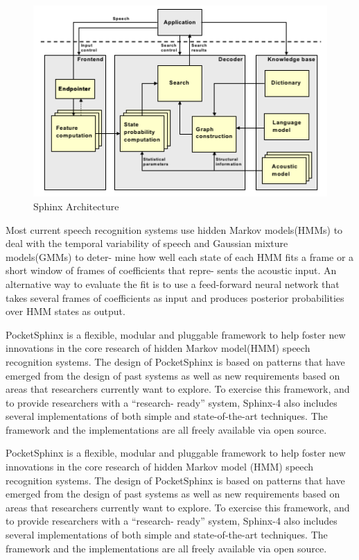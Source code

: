 \documentclass[12pt,a4paper,oldfontcommands]{memoir}
\begin{document}
\begin{figure}[h]
    \centering
    \includegraphics[scale=1.0]{sphinx4_architecture}
    \caption{Sphinx Architecture}
\end{figure}


Most current speech recognition systems use hidden Markov models(HMMs) to deal with the temporal variability of speech and Gaussian mixture models(GMMs) to deter- mine how well each state of each HMM fits a frame or a short window of frames of coefficients that repre- sents the acoustic input. An alternative way to evaluate the fit is to use a feed-forward neural network that takes several frames of coefficients as input and produces posterior probabilities over HMM states as output.

PocketSphinx is a flexible, modular and pluggable framework to help foster new innovations in the core research of hidden Markov model(HMM) speech recognition systems. The design of PocketSphinx is based on patterns that have emerged from the design of past systems as well as new requirements based on areas that researchers currently want to explore. To exercise this framework, and to provide researchers with a “research- ready” system, Sphinx-4 also includes several implementations of both simple and state-of-the-art techniques. The framework and the implementations are all freely available via open source.

PocketSphinx is a flexible, modular and pluggable framework to help foster new innovations in the core research of hidden Markov model (HMM) speech recognition systems. The design of PocketSphinx is based on patterns that have emerged from the design of past systems as well as new requirements based on areas that researchers currently want to explore. To exercise this framework, and to provide researchers with a “research- ready” system, Sphinx-4 also includes several implementations of both simple and state-of-the-art techniques. The framework and the implementations are all freely available via open source.
\end{document}
